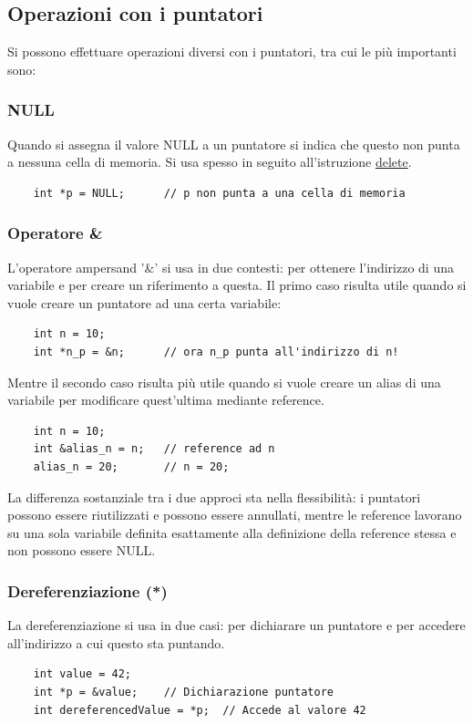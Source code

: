 \documentclass[12pt]{article}
\begin{document}
\subsection{Operazioni con i puntatori}
\label{ssec:pointers_operations}
Si possono effettuare operazioni diversi con i puntatori, tra cui le più importanti sono:

\subsubsection{NULL}
\label{sssec:NULL_operator}
Quando si assegna il valore NULL a un puntatore si indica che questo non punta a nessuna cella di memoria. Si usa spesso in seguito all'istruzione \hyperref[sssec:delete_operator]{delete}.
\begin{lstlisting}
    int *p = NULL;      // p non punta a una cella di memoria
\end{lstlisting}

\subsubsection{Operatore \&}
\label{sssec:ampersand_operator}
L'operatore ampersand '\&' si usa in due contesti: per ottenere l'indirizzo di una variabile e per creare un riferimento a questa.
Il primo caso risulta utile quando si vuole creare un puntatore ad una certa variabile:
\begin{lstlisting}
    int n = 10;
    int *n_p = &n;      // ora n_p punta all'indirizzo di n!
\end{lstlisting}
Mentre il secondo caso risulta più utile quando si vuole creare un alias di una variabile per modificare quest'ultima mediante reference.
\begin{lstlisting}
    int n = 10;
    int &alias_n = n;   // reference ad n
    alias_n = 20;       // n = 20;
\end{lstlisting}
La differenza sostanziale tra i due approci sta nella flessibilità: i puntatori possono essere riutilizzati e possono essere annullati, mentre le reference lavorano su una sola variabile definita esattamente alla definizione della reference stessa e non possono essere NULL.

\subsubsection{Dereferenziazione (*)}
\label{sssec:deref}
La dereferenziazione si usa in due casi: per dichiarare un puntatore e per accedere all'indirizzo a cui questo sta puntando.
\begin{lstlisting}
    int value = 42;
    int *p = &value;    // Dichiarazione puntatore
    int dereferencedValue = *p;  // Accede al valore 42
\end{lstlisting}
\end{document}
